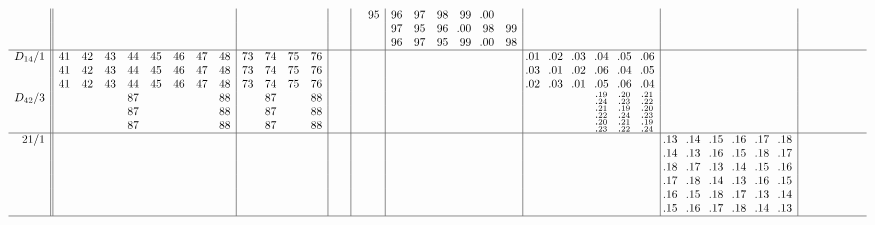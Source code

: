 \documentclass[12pt,a4paper]{amsart}
\begin{document}
\begin{align*}
\begin{array}{r||cccccccc|cccc|cc|cc|cccccc|cccccc|cccccc|cccccc}
  &  &  &  &  &  &  &  &  &  &  &  &  &  &&&95&96&97&98&99&\llap{.}00&&&&&&&&&&&&&&&&&&\\
&
  &  &  &  &  &  &  &  &  &  &  &  &  &  &&&97&95&96&\llap{.}00&98&99&&&&&&&&&&&&&&&&&&\\
&
  &  &  &  &  &  &  &  &  &  &  &  &  &  &&&96&97&95&99&\llap{.}00&98&&&&&&&&&&&&&&&&&&\\ \hline
D_{14}/1&
41&42&43&44&45&46&47&48&73&74&75&76&  &  &  &  &  &  &  &  &&&\llap{.}01&\llap{.}02&\llap{.}03&\llap{.}04&\llap{.}05&\llap{.}06&&&&&&&&&&&&\\
&
41&42&43&44&45&46&47&48&73&74&75&76&  &  &  &  &  &  &  &  &&&\llap{.}03&\llap{.}01&\llap{.}02&\llap{.}06&\llap{.}04&\llap{.}05&&&&&&&&&&&&\\
&
41&42&43&44&45&46&47&48&73&74&75&76&  &  &  &  &  &  &  &  &&&\llap{.}02&\llap{.}03&\llap{.}01&\llap{.}05&\llap{.}06&\llap{.}04&&&&&&&&&&&&\\
D_{42}/3&
  &  &  &87&  &  &  &88&  &87&  &88&  &  &  &  &  &  &  &  &  &  &&&&^{\llap{.}19}_{\llap{.}24}&^{\llap{.}20}_{\llap{.}23}&^{\llap{.}21}_{\llap{.}22}&&&&&&&&&&&&\\
&
  &  &  &87&  &  &  &88&  &87&  &88&  &  &  &  &  &  &  &  &  &  &&&&^{\llap{.}21}_{\llap{.}22}&^{\llap{.}19}_{\llap{.}24}&^{\llap{.}20}_{\llap{.}23}&&&&&&&&&&&&\\
&
  &  &  &87&  &  &  &88&  &87&  &88&  &  &  &  &  &  &  &  &  &  &&&&^{\llap{.}20}_{\llap{.}23}&^{\llap{.}21}_{\llap{.}22}&^{\llap{.}19}_{\llap{.}24}&&&&&&&&&&&&\\ \hline
21/1&
  &  &  &  &  &  &  &  &  &  &  &  &  &  &  &  &  &  &  &  &  &  &  &  &&&&&\llap{.}13&\llap{.}14&\llap{.}15&\llap{.}16&\llap{.}17&\llap{.}18&&&&&&\\
&
  &  &  &  &  &  &  &  &  &  &  &  &  &  &  &  &  &  &  &  &  &  &  &  &&&&&\llap{.}14&\llap{.}13&\llap{.}16&\llap{.}15&\llap{.}18&\llap{.}17&&&&&&\\
&
  &  &  &  &  &  &  &  &  &  &  &  &  &  &  &  &  &  &  &  &  &  &  &  &&&&&\llap{.}18&\llap{.}17&\llap{.}13&\llap{.}14&\llap{.}15&\llap{.}16&&&&&&\\
&
  &  &  &  &  &  &  &  &  &  &  &  &  &  &  &  &  &  &  &  &  &  &  &  &&&&&\llap{.}17&\llap{.}18&\llap{.}14&\llap{.}13&\llap{.}16&\llap{.}15&&&&&&\\
&
  &  &  &  &  &  &  &  &  &  &  &  &  &  &  &  &  &  &  &  &  &  &  &  &&&&&\llap{.}16&\llap{.}15&\llap{.}18&\llap{.}17&\llap{.}13&\llap{.}14&&&&&&\\
&
  &  &  &  &  &  &  &  &  &  &  &  &  &  &  &  &  &  &  &  &  &  &  &  &&&&&\llap{.}15&\llap{.}16&\llap{.}17&\llap{.}18&\llap{.}14&\llap{.}13&&&&&&\\ \hline

\end{array}
\end{align*}
\end{document}
